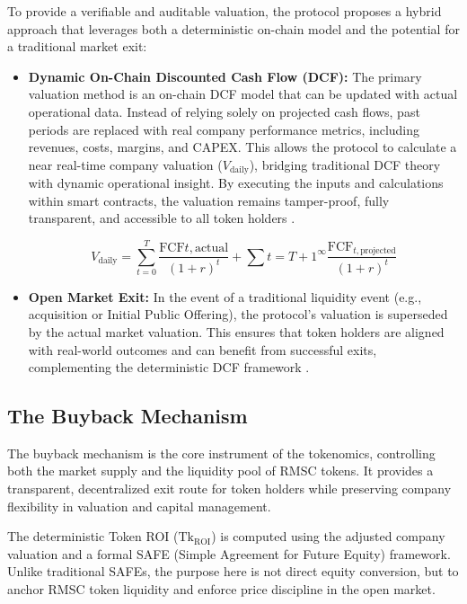 \documentclass[conference]{IEEEtran}
\begin{document}
To provide a verifiable and auditable valuation, the protocol proposes a hybrid approach that leverages both a deterministic on-chain model and the potential for a traditional market exit:

\begin{itemize}
\item \textbf{Dynamic On-Chain Discounted Cash Flow (DCF):}
The primary valuation method is an on-chain DCF model that can be updated with actual operational data. Instead of relying solely on projected cash flows, past periods are replaced with real company performance metrics, including revenues, costs, margins, and CAPEX. This allows the protocol to calculate a near real-time company valuation ($V_\text{daily}$), bridging traditional DCF theory with dynamic operational insight. By executing the inputs and calculations within smart contracts, the valuation remains tamper-proof, fully transparent, and accessible to all token holders \cite{Laitinen2019,Steiger2010}.

\begin{equation}
V_{\text{daily}} = \sum_{t=0}^{T} \frac{\text{FCF}{t,\text{actual}}}{(1+r)^t} + \sum{t=T+1}^{\infty} \frac{\text{FCF}_{t,\text{projected}}}{(1+r)^t}
\end{equation}


\item \textbf{Open Market Exit:}
In the event of a traditional liquidity event (e.g., acquisition or Initial Public Offering), the protocol's valuation is superseded by the actual market valuation. This ensures that token holders are aligned with real-world outcomes and can benefit from successful exits, complementing the deterministic DCF framework \cite{Montani2020,Olsen2019}.
\end{itemize}

\subsection{The Buyback Mechanism}

The buyback mechanism is the core instrument of the tokenomics, controlling both the market supply and the liquidity pool of RMSC tokens. It provides a transparent, decentralized exit route for token holders while preserving company flexibility in valuation and capital management.

The deterministic Token ROI (\(\mathrm{Tk_{ROI}}\)) is computed using the adjusted company valuation and a formal SAFE (Simple Agreement for Future Equity) framework. Unlike traditional SAFEs, the purpose here is not direct equity conversion, but to anchor RMSC token liquidity and enforce price discipline in the open market.
\end{document}
